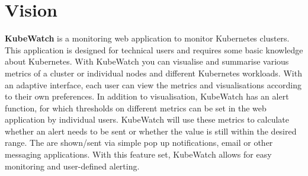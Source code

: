 \chapter{Vision}

\textbf{KubeWatch} is a monitoring web application to monitor Kubernetes clusters. This application is designed for technical users and requires some basic knowledge about Kubernetes. With KubeWatch you can visualise and summarise various metrics of a cluster or individual nodes and different Kubernetes workloads. With an adaptive interface, each user can view the metrics and visualisations according to their own preferences. In addition to visualisation, KubeWatch has an alert function, for which thresholds on different metrics can be set in the web application by individual users. KubeWatch will use these metrics to calculate whether an alert needs to be sent or whether the value is still within the desired range. The are shown/sent via simple pop up notifications, email or other messaging applications. With this feature set, KubeWatch allows for easy monitoring and user-defined alerting.